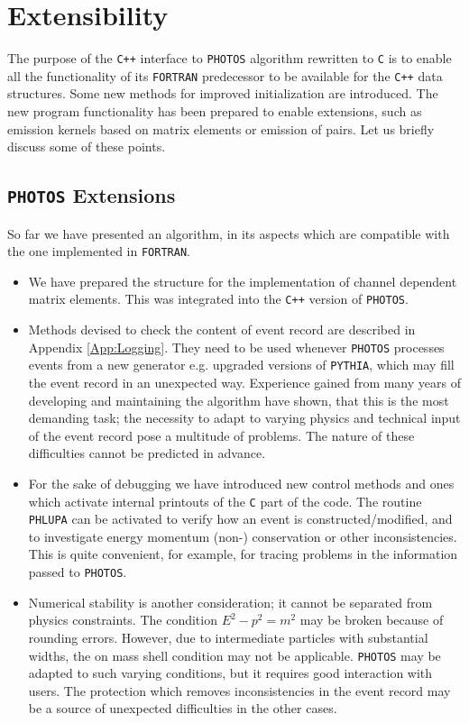 \documentclass[]{Photos_interface_design}
\begin{document}
\section{Extensibility}
\label{sec:extensibility}
 The purpose of the {\tt C++} interface to {\tt PHOTOS} algorithm rewritten to {\tt C} is to enable 
all the functionality of its {\tt FORTRAN} predecessor to be available for the 
{\tt C++} data
structures. Some new methods for improved initialization are introduced. The new program 
functionality has been prepared to enable extensions, such as emission kernels based on matrix elements
or emission of pairs. 
Let us briefly discuss some of these points.

\subsection{{\tt PHOTOS} Extensions}
So far  we have presented an algorithm, in its  
aspects which are compatible with the one implemented in {\tt FORTRAN}.

\begin{itemize}


\item
We have prepared the structure 
for the implementation of channel dependent matrix elements. This was   
integrated into the {\tt C++} version of {\tt PHOTOS}. 

\item
Methods devised to check the content of event record are described in Appendix \ref{App:Logging}. 
They need to be used whenever {\tt PHOTOS} 
processes events from a new generator e.g. upgraded versions of  {\tt PYTHIA},
which may fill the event record in an unexpected way.
Experience gained from many years of developing and maintaining the algorithm
have shown, that this is the most demanding task; the necessity to
adapt to varying physics and technical input of the event record pose
a multitude of problems. The nature of these difficulties cannot be
predicted in advance. 

\item
For the sake of debugging we have introduced new control methods 
and ones which activate
internal printouts of the {\tt C} part of the code.
The routine {\tt PHLUPA} \cite{Barberio:1993qi} can be activated  to verify 
how an event is constructed/modified, and to investigate energy 
momentum (non-) conservation or other inconsistencies.
This is quite convenient, for example, for tracing problems in the
information passed to {\tt PHOTOS}.


\item
Numerical stability is another consideration; it cannot be separated from
physics constraints. The condition  $E^2-p^2=m^2$ may be broken  because of 
rounding errors.  However, due to intermediate particles with
  substantial widths, the on mass shell condition may not be applicable.
{\tt PHOTOS} may be adapted to such varying conditions, but it requires
good interaction with users. The protection which removes 
inconsistencies in the event record may be a source of unexpected difficulties
in the other cases. 
\end{itemize}
\end{document}
